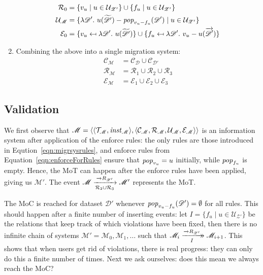 \documentclass[runningheads]{llncs}
\newcommand{\xrightarrowdbl}[2][]{%
  \xrightarrow[#1]{#2}\mathrel{\mkern-14mu}\rightarrow
}
\newcommand{\id}[1]{\text{\it #1\/}}
\newcommand{\popF}[1]{\id{pop}_{#1}}
\newcommand{\pop}[2]{\popF{#1}(#2)}
\newcommand{\instance}{\mathbin{\id{inst}}}
\newcommand{\viol}[2]{{#1}(#2)}
\newcommand{\pair}[2]{\langle{#1},{#2}\rangle}
\newcommand{\quadruple}[4]{\langle{#1},{#2},{#3},{#4}\rangle}
\newcommand{\concepts}{\mathcal{C}}
\newcommand{\rels}{\mathcal{R}}   %
\newcommand{\triples}{\mathcal{T}}
\newcommand{\enforces}{\mathcal{E}}
\newcommand{\rules}{\mathcal{U}}
\newcommand{\dataset}{\mathscr{D}}
\newcommand{\schema}{\mathscr{Z}}
\newcommand{\migrsys}{\mathscr{M}}
\begin{document}
\begin{enumerate}
\begin{align}
   \rels_\theenumi &= \{v_u\mid u \in \rules_{\schema'}\} \cup \{f_u\mid u \in \rules_{\schema'}\}\\
   \rules_\migrsys &= \{\lambda {\dataset'}.~ \viol{u}{\widetilde{\dataset'}} - \pop{v_u - f_u}{\dataset'} \mid u\in\rules_{\schema'}\}\label{eqn:migrsysrules}\\
   \enforces_{\theenumi} &=\{v_u \mapsfrom \lambda \dataset'.~ \viol{u}{\widetilde{\dataset'}}\} \cup
    \{f_u \mapsfrom \lambda \dataset'.~ v_u - \viol{u}{\overrightarrow{\dataset'}}\}\label{eqn:enforceForRules}
   \end{align}
   \item Combining the above into a single migration system:
   \begin{align}
   \concepts_\migrsys &= \concepts_\dataset \cup  \concepts_{\dataset'}\\
   \rels_\migrsys &= \rels_1\cup\rels_2\cup \rels_3\\
   \enforces_\migrsys &= \enforces_1\cup\enforces_2\cup\enforces_3
   \end{align}
   \end{enumerate}
   
   \subsection{Validation}
   We first observe that $\migrsys = \pair{\pair{\triples_\migrsys}{\instance_\migrsys}}{\quadruple{\concepts_\migrsys}{\rels_\migrsys}{\rules_\migrsys}{\enforces_\migrsys}}$ is an information system after application of the enforce rules:
   the only rules are those introduced in Eqution~\ref{eqn:migrsysrules}, and enforce rules from Equation~\ref{eqn:enforceForRules} ensure that $\popF{v_u} = u$ initially, while $\popF{f_u}$ is empty.
   Hence, the MoT can happen after the enforce rules have been applied, giving us $\migrsys'$.
   The event $\migrsys \xrightarrow[\rels_2 \cup \rels_3]{\overrightarrow\rels_{\schema'}}\migrsys'$ represents the MoT.
   
   The MoC is reached for dataset $\dataset'$ whenever $\pop{v_u - f_u}{\dataset'}=\emptyset$ for all rules.
   This should happen after a finite number of inserting events: let $I = \{f_u \mid u\in\rules_{\schema'}\}$ be the relations that keep track of which violations have been fixed, then there is no infinite chain of systems $\migrsys' = \migrsys_0, \migrsys_1,\ldots$ such that $\migrsys_i\xrightarrowdbl[I]{\overrightarrow\rels_{\schema'}}\migrsys_{i+1}$.
   This shows that when users get rid of violations, there is real progress: they can only do this a finite number of times.
   Next we ask ourselves: does this mean we always reach the MoC?
   
\end{document}
